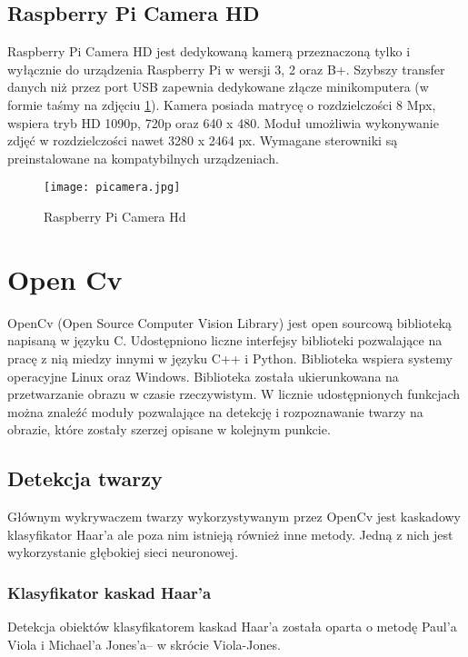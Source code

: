 \subsection{Raspberry Pi Camera HD}
Raspberry Pi Camera HD jest dedykowaną kamerą przeznaczoną tylko i wyłącznie do urządzenia Raspberry Pi w wersji 3, 2 oraz B+. Szybszy transfer danych niż przez port USB zapewnia dedykowane złącze minikomputera (w formie taśmy na zdjęciu \ref{fig:picamera}). Kamera posiada matrycę o rozdzielczości 8 Mpx, wspiera tryb HD 1090p, 720p oraz 640 x 480. Moduł umożliwia wykonywanie zdjęć w rozdzielczości nawet 3280 x 2464 px. Wymagane sterowniki są preinstalowane na kompatybilnych urządzeniach.
\begin{figure}[H]
	\centering
	\texttt{[image: picamera.jpg]}
	\caption{Raspberry Pi Camera Hd}
	\label{fig:picamera}
\end{figure}

\section{Open Cv}
OpenCv (Open Source Computer Vision Library) jest open sourcową biblioteką napisaną w języku C. Udostępniono liczne interfejsy biblioteki pozwalające na pracę z nią miedzy innymi w języku C++ i Python. Biblioteka wspiera systemy operacyjne Linux oraz Windows. Biblioteka została ukierunkowana na przetwarzanie obrazu w czasie rzeczywistym. W licznie udostępnionych funkcjach można znaleźć moduły pozwalające na detekcję i rozpoznawanie twarzy na obrazie, które zostały szerzej opisane w kolejnym punkcie.

\subsection{Detekcja twarzy}
Głównym wykrywaczem twarzy wykorzystywanym przez OpenCv jest kaskadowy klasyfikator Haar'a ale poza nim istnieją również inne metody. Jedną z nich jest wykorzystanie głębokiej sieci neuronowej.

\subsubsection{Klasyfikator kaskad Haar'a} \label{haar}
Detekcja obiektów klasyfikatorem kaskad Haar'a została oparta o metodę Paul'a Viola i Michael'a Jones'a– w skrócie Viola-Jones.

